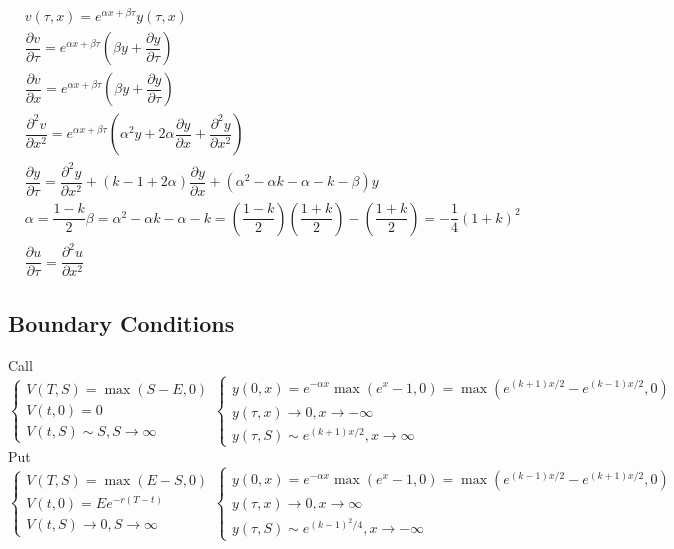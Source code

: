 \documentclass[16pt]{article}
\begin{document}
		\begin{eqnarray*}
		    &v(\tau, x) = e^{\alpha x + \beta \tau} y(\tau, x) \\
			&\dfrac{\partial v}{\partial \tau} = e^{\alpha x + \beta \tau} \left(\beta y  + \dfrac{\partial y}{\partial \tau}\right) \\
			&\dfrac{\partial v}{\partial x} = e^{\alpha x + \beta \tau} \left(\beta y  + \dfrac{\partial y}{\partial \tau}\right) \\
			&\dfrac{\partial^2 v}{\partial x^2} = e^{\alpha x + \beta \tau} \left(\alpha^2 y
			  +  2 \alpha \dfrac{\partial y}{\partial x} + \dfrac{\partial^2 y}{\partial x^2}\right) \\
			&\dfrac{\partial y}{\partial \tau} = \dfrac{\partial^2 y }{\partial x^2} + 
			\left(k -1 + 2\alpha\right)\dfrac{\partial y}{\partial x} +
			\left(\alpha^2 - \alpha k - \alpha  - k  - \beta\right) y \\
			&\alpha = \dfrac{1 - k}{2} 
			\beta =  \alpha^2 - \alpha k - \alpha  - k 	 = \left(\dfrac{1- k}{2}\right)	 \left(\dfrac{1+ k}{2}\right) -  \left(\dfrac{1 + k}{2}\right)	 = -\dfrac{1}{4}(1+k)^2 \\
			&\dfrac{\partial u}{\partial \tau} = \dfrac{\partial^2 u}{\partial x^2}		
		\end{eqnarray*}
	
		\subsection{Boundary Conditions}
		Call
		\begin{equation}
			\begin{cases}
				V(T,S) = \max\left(S - E, 0\right) \\
				V(t,0) = 0 \\
				V(t,S) \sim  S, S \rightarrow \infty
			\end{cases}
			\begin{cases}
				y(0,x) = e^{-\alpha x}\max\left(e^x - 1, 0\right) = \max\left(e^{(k+1)x/2} - e^{(k-1)x/2}, 0\right) \\
				y(\tau,x) \rightarrow 0, x \rightarrow - \infty \\
				y(\tau,S) \sim  e^{(k+1)x/2}, x \rightarrow \infty
			\end{cases}
		\end{equation}
		Put
		\begin{equation}
			\begin{cases}
				V(T,S) = \max\left(E - S, 0\right) \\
				V(t,0) = Ee^{-r(T-t)} \\
				V(t,S)  \rightarrow  0 , S \rightarrow \infty
			\end{cases}
			\begin{cases}
				y(0,x) = e^{-\alpha x}\max\left(e^x - 1, 0\right) = \max\left(e^{(k-1)x/2} - e^{(k+1)x/2}, 0\right) \\
				y(\tau,x) \rightarrow 0, x \rightarrow  \infty \\
				y(\tau,S) \sim  e^{(k-1)^2/4}, x \rightarrow  -\infty
			\end{cases}
		\end{equation}
			
	
		
	
	
\end{document}
